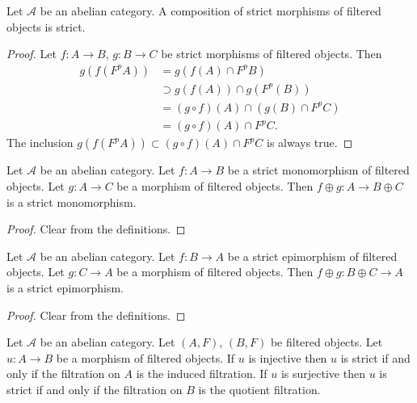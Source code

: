 \begin{lemma}
\label{lemma-composition-strict}
Let $\mathcal{A}$ be an abelian category.
A composition of strict morphisms of filtered objects is strict.
\end{lemma}

\begin{proof}
Let $f : A \to B$, $g : B \to C$ be strict morphisms of filtered objects.
Then
\begin{align*}
g(f(F^pA)) & = g(f(A) \cap F^pB) \\
& \supset g(f(A)) \cap g(F^p(B)) \\
& = (g \circ f)(A) \cap (g(B) \cap F^pC) \\
& = (g \circ f)(A) \cap F^pC.
\end{align*}
The inclusion $g(f(F^pA)) \subset (g \circ f)(A) \cap F^pC$ is
always true.
\end{proof}

\begin{lemma}
\label{lemma-add-summand-strict-monomorphism}
Let $\mathcal{A}$ be an abelian category.
Let $f : A \to B$ be a strict monomorphism of filtered objects.
Let $g : A \to C$ be a morphism of filtered objects.
Then $f \oplus g : A \to B \oplus C$ is a strict monomorphism.
\end{lemma}

\begin{proof}
Clear from the definitions.
\end{proof}

\begin{lemma}
\label{lemma-add-summand-strict-epimorphism}
Let $\mathcal{A}$ be an abelian category.
Let $f : B \to A$ be a strict epimorphism of filtered objects.
Let $g : C \to A$ be a morphism of filtered objects.
Then $f \oplus g : B \oplus C \to A$ is a strict epimorphism.
\end{lemma}

\begin{proof}
Clear from the definitions.
\end{proof}

\begin{lemma}
\label{lemma-induced-and-quotient-strict}
Let $\mathcal{A}$ be an abelian category.
Let $(A, F)$, $(B, F)$ be filtered objects.
Let $u : A \to B$ be a morphism of filtered objects.
If $u$ is injective then $u$ is strict if and only if the filtration
on $A$ is the induced filtration.
If $u$ is surjective then $u$ is strict if and only if the filtration
on $B$ is the quotient filtration.
\end{lemma}

